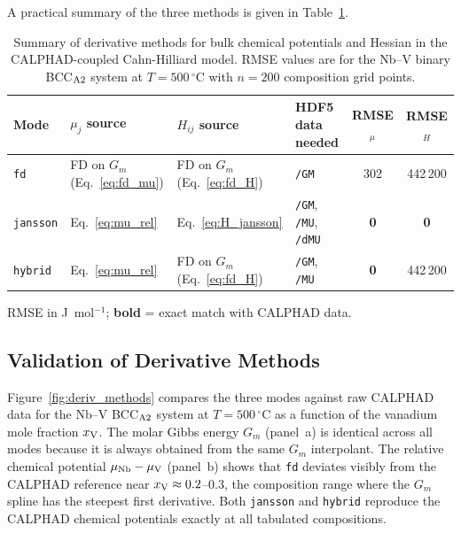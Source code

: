A practical summary of the three methods is given in
Table~\ref{tab:methods}.

\begin{table}[htbp]
  \centering
  \caption{%
    Summary of derivative methods for bulk chemical potentials and
    Hessian in the CALPHAD-coupled Cahn-Hilliard model.
    RMSE values are for the Nb--V binary BCC$_{\rm A2}$ system at
    $T = 500\,^\circ$C with $n = 200$ composition grid points.
  }
  \label{tab:methods}
  \setlength{\tabcolsep}{6pt}
  \renewcommand{\arraystretch}{1.25}
  \begin{tabular}{llllcc}
    \hline
    Mode & $\mu_j$ source & $H_{ij}$ source
         & HDF5 data needed
         & RMSE$_\mu$ & RMSE$_H$ \\
    \hline
    \texttt{fd}
      & FD on $G_m$ (Eq.~\ref{eq:fd_mu})
      & FD on $G_m$ (Eq.~\ref{eq:fd_H})
      & \texttt{/GM}
      & 302 & 442\,200 \\
    \texttt{jansson}
      & Eq.~\ref{eq:mu_rel}
      & Eq.~\ref{eq:H_jansson}
      & \texttt{/GM}, \texttt{/MU}, \texttt{/dMU}
      & \textbf{0} & \textbf{0} \\
    \texttt{hybrid}
      & Eq.~\ref{eq:mu_rel}
      & FD on $G_m$ (Eq.~\ref{eq:fd_H})
      & \texttt{/GM}, \texttt{/MU}
      & \textbf{0} & 442\,200 \\
    \hline
  \end{tabular}
  \par\smallskip
  \footnotesize RMSE in J~mol$^{-1}$; \textbf{bold} = exact match
  with CALPHAD data.
\end{table}

\subsection{Validation of Derivative Methods}
\label{sec:validation}

Figure~\ref{fig:deriv_methods} compares the three modes against raw
CALPHAD data for the Nb--V BCC$_{\rm A2}$ system at
$T = 500\,^\circ$C as a function of the vanadium mole fraction
$x_{\rm V}$.  The molar Gibbs energy $G_m$ (panel~a) is identical
across all modes because it is always obtained from the same
$G_m$ interpolant.  The relative chemical potential
$\mu_{\rm Nb} - \mu_{\rm V}$ (panel~b) shows that \texttt{fd}
deviates visibly from the CALPHAD reference near
$x_{\rm V} \approx 0.2$--$0.3$, the composition range where the
$G_m$ spline has the steepest first derivative.  Both \texttt{jansson}
and \texttt{hybrid} reproduce the CALPHAD chemical potentials exactly
at all tabulated compositions.

